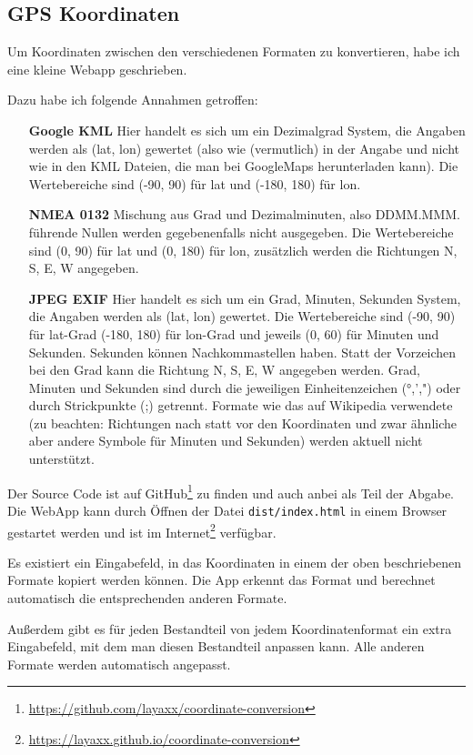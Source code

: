 \subsection{GPS Koordinaten}
\label{sec:coord-conversion}

Um Koordinaten zwischen den verschiedenen Formaten zu konvertieren, habe ich eine kleine Webapp geschrieben.

Dazu habe ich folgende Annahmen getroffen:

\begin{itemize}[align=left, leftmargin=*]
    \item[\textbf{Google KML}] Hier handelt es sich um ein Dezimalgrad System, die Angaben werden als (lat, lon) gewertet (also wie (vermutlich) in der Angabe und nicht wie in den KML Dateien, die man bei GoogleMaps herunterladen kann). Die Wertebereiche sind (-90, 90) für lat und (-180, 180) für lon.
    \item[\textbf{NMEA 0132}] Mischung aus Grad und Dezimalminuten, also DDMM.MMM. führende Nullen werden gegebenenfalls nicht ausgegeben. Die Wertebereiche sind (0, 90) für lat und (0, 180) für lon, zusätzlich werden die Richtungen N, S, E, W angegeben.
    \item[\textbf{JPEG EXIF}] Hier handelt es sich um ein Grad, Minuten, Sekunden System, die Angaben werden als (lat, lon) gewertet. Die Wertebereiche sind (-90, 90) für lat-Grad (-180, 180) für lon-Grad und jeweils (0, 60) für Minuten und Sekunden. Sekunden können Nachkommastellen haben. Statt der Vorzeichen bei den Grad kann die Richtung N, S, E, W angegeben werden. Grad, Minuten und Sekunden sind durch die jeweiligen Einheitenzeichen (°,',") oder durch Strickpunkte (;) getrennt. Formate wie das auf Wikipedia verwendete (zu beachten: Richtungen nach statt vor den Koordinaten und zwar ähnliche aber andere Symbole für Minuten und Sekunden) werden aktuell nicht unterstützt.
\end{itemize}

Der Source Code ist auf GitHub\footnote{\url{https://github.com/layaxx/coordinate-conversion}} zu finden und auch anbei als Teil der Abgabe. Die WebApp kann durch Öffnen der Datei \verb|dist/index.html| in einem Browser gestartet werden und ist im Internet\footnote{\url{https://layaxx.github.io/coordinate-conversion}} verfügbar.

Es existiert ein Eingabefeld, in das Koordinaten in einem der oben beschriebenen Formate kopiert werden können. Die App erkennt das Format und berechnet automatisch die entsprechenden anderen Formate.

Außerdem gibt es für jeden Bestandteil von jedem Koordinatenformat ein extra Eingabefeld, mit dem man diesen Bestandteil anpassen kann. Alle anderen Formate werden automatisch angepasst.